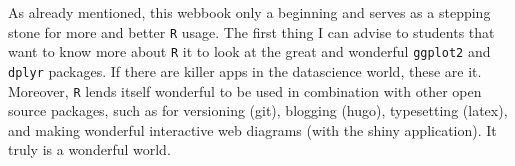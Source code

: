 \documentclass[]{article}
\theoremstyle{definition}
\theoremstyle{definition}
\theoremstyle{definition}
\theoremstyle{remark}
\begin{document}
As already mentioned, this webbook only a beginning and serves as a
stepping stone for more and better \texttt{R} usage. The first thing I
can advise to students that want to know more about \texttt{R} it to
look at the great and wonderful \texttt{ggplot2} and \texttt{dplyr}
packages. If there are killer apps in the datascience world, these are
it. Moreover, \texttt{R} lends itself wonderful to be used in
combination with other open source packages, such as for versioning
(git), blogging (hugo), typesetting (latex), and making wonderful
interactive web diagrams (with the shiny application). It truly is a
wonderful world.
\end{document}
